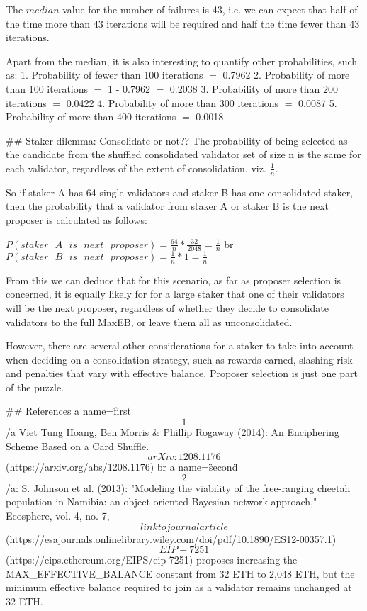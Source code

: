 The $median$ value for the number of failures is 43, i.e. we can expect
that half of the time more than 43 iterations will be required and half
the time fewer than 43 iterations.

Apart from the median, it is also interesting to quantify other
probabilities, such as: 1. Probability of fewer than 100 iterations $=$
0.7962 2. Probability of more than 100 iterations $=$ 1 - 0.7962 $=$
0.2038 3. Probability of more than 200 iterations $=$ 0.0422 4.
Probability of more than 300 iterations $=$ 0.0087 5. Probability of
more than 400 iterations $=$ 0.0018

\## Staker dilemma: Consolidate or not?? The probability of being
selected as the candidate from the shuffled consolidated validator set
of size \*n\* is the same for each validator, regardless of the extent
of consolidation, viz. $\frac{1}{n}$.

So if staker \*A\* has 64 single validators and staker \*B\* has one
consolidated staker, then the probability that a validator from staker
\*A\* or staker \*B\* is the next proposer is calculated as follows:

$P(staker \texttt{ } A \texttt{ } is \texttt{ } next \texttt{ } proposer) =
 \frac{64}{n} * \frac{32}{2048} = \frac{1}{n}$ \<br\>
$P(staker \texttt{ } B \texttt{ } is \texttt{ } next \texttt{ } proposer) =
 \frac{1}{n} * 1 = \frac{1}{n}$

From this we can deduce that for this scenario, as far as proposer
selection is concerned, it is equally likely for for a large staker that
one of their validators will be the next proposer, regardless of whether
they decide to consolidate validators to the full MaxEB, or leave them
all as unconsolidated.

However, there are several other considerations for a staker to take
into account when deciding on a consolidation strategy, such as rewards
earned, slashing risk and penalties that vary with effective balance.
Proposer selection is just one part of the puzzle.

\## References \<a name=\"first\"\>\[1\]\</a\> Viet Tung Hoang, Ben
Morris & Phillip Rogaway (2014): An Enciphering Scheme Based on a Card
Shuffle. \[arXiv:1208.1176\](https://arxiv.org/abs/1208.1176) \<br\> \<a
name=\"second\"\>\[2\]\</a\>: S. Johnson et al. (2013): "Modeling the
viability of the free-ranging cheetah population in Namibia: an
object-oriented Bayesian network approach," Ecosphere, vol. 4, no. 7,
\[link to journal
article\](https://esajournals.onlinelibrary.wiley.com/doi/pdf/10.1890/ES12-00357.1)\[EIP-7251\](https://eips.ethereum.org/EIPS/eip-7251)
proposes increasing the \*MAX_EFFECTIVE_BALANCE\* constant from 32 ETH
to 2,048 ETH, but the \*minimum effective balance\* required to join as
a validator remains unchanged at 32 ETH.

